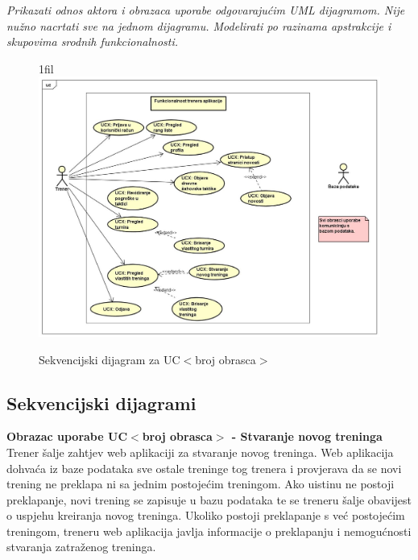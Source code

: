 					\textit{Prikazati odnos aktora i obrazaca uporabe odgovarajućim UML dijagramom. Nije nužno nacrtati sve na jednom dijagramu. Modelirati po razinama apstrakcije i skupovima srodnih funkcionalnosti.}
				\eject		
				
								\makeatletter
                                                                        \newcommand*{\centerfloat}{%
                                                                          \parindent \z@
                                                                          \leftskip \z@ \@plus 1fil \@minus \textwidth
                                                                          \rightskip\leftskip
                                                                          \parfillskip \z@skip}
                                                                   \makeatother
				
		\begin{figure}[H]
			\centerfloat
			\includegraphics[scale=0.48]{dijagrami/UseCaseTrener.jpg} %
			\caption{Sekvencijski dijagram za UC$<$broj obrasca$>$}
			\label{fig:UC$<$broj obrasca$>$}
		\end{figure}
		
		\eject
				
			\subsection{Sekvencijski dijagrami}
			
			
				\textbf{Obrazac uporabe UC$<$broj obrasca$>$ - Stvaranje novog treninga}\\
				Trener šalje zahtjev web aplikaciji za stvaranje novog treninga. Web aplikacija dohvaća iz baze podataka sve ostale treninge tog trenera i provjerava da se novi trening ne preklapa ni sa jednim postojećim treningom. Ako uistinu ne postoji preklapanje, novi trening se zapisuje u bazu podataka te se treneru šalje obavijest o uspjehu kreiranja novog treninga. Ukoliko postoji preklapanje s već postojećim treningom, treneru web aplikacija javlja informacije o preklapanju i nemogućnosti stvaranja zatraženog treninga.
				\eject
				
